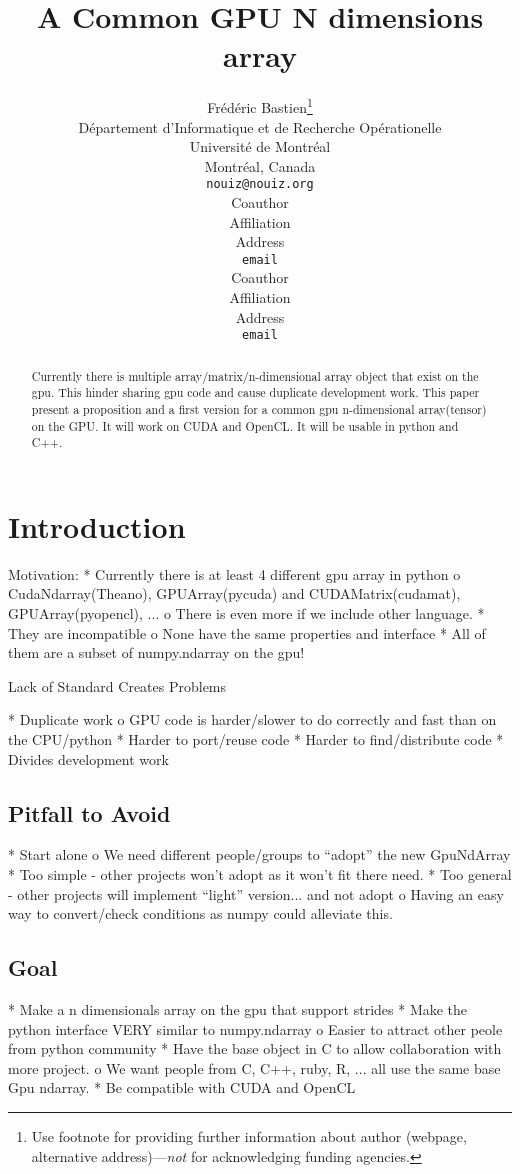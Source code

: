 \documentclass{article} %
\title{A Common GPU N dimensions array}
\author{
Frédéric Bastien\thanks{ Use footnote for providing further information
about author (webpage, alternative address)---\emph{not} for acknowledging
funding agencies.} \\
D\'epartement d'Informatique et de Recherche Op\'erationelle\\
Universit\'e de Montr\'eal\\
Montréal, Canada \\
\texttt{nouiz@nouiz.org} \\
\And
Coauthor \\
Affiliation \\
Address \\
\texttt{email} \\
\AND
Coauthor \\
Affiliation \\
Address \\
\texttt{email} \\
}
\begin{document}
\maketitle

\begin{abstract}
Currently there is multiple array/matrix/n-dimensional array
object that exist on the gpu.  This hinder sharing gpu code and cause
duplicate development work. This paper present a proposition and a
first version for a common gpu n-dimensional array(tensor) on the GPU. It will
work on CUDA and OpenCL. It will be usable in python and C++.
\end{abstract}

\section{Introduction}
Motivation:
    * Currently there is at least 4 different gpu array in python
          o CudaNdarray(Theano), GPUArray(pycuda) and CUDAMatrix(cudamat), GPUArray(pyopencl), ...
          o There is even more if we include other language.
    * They are incompatible
          o None have the same properties and interface
    * All of them are a subset of numpy.ndarray on the gpu!

Lack of Standard Creates Problems

    * Duplicate work
          o GPU code is harder/slower to do correctly and fast than on the CPU/python
    * Harder to port/reuse code
    * Harder to find/distribute code
    * Divides development work


\subsection{Pitfall to Avoid}
    * Start alone
          o We need different people/groups to ``adopt'' the new GpuNdArray
    * Too simple - other projects won't adopt as it won't fit there need.
    * Too general - other projects will implement ``light'' version... and not adopt
          o Having an easy way to convert/check conditions as numpy could alleviate this.


\subsection{Goal}
    * Make a n dimensionals array on the gpu that support strides
    * Make the python interface VERY similar to numpy.ndarray
          o Easier to attract other peole from python community
    * Have the base object in C to allow collaboration with more project.
          o We want people from C, C++, ruby, R, ... all use the same base Gpu ndarray.
    * Be compatible with CUDA and OpenCL
\end{document}
